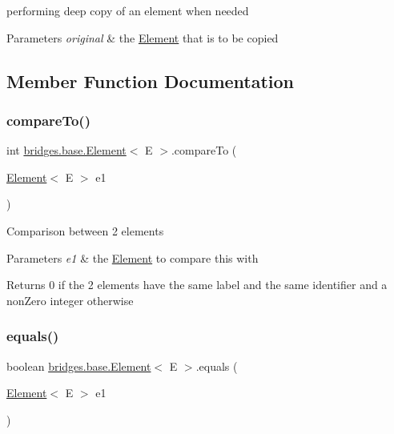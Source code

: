 performing deep copy of an element when needed


\begin{DoxyParams}{Parameters}
{\em original} & the \mbox{\hyperlink{classbridges_1_1base_1_1_element}{Element}} that is to be copied \\
\hline
\end{DoxyParams}


\subsection{Member Function Documentation}
\mbox{\label{classbridges_1_1base_1_1_element_a6cd4c4f15c6a4f87f59e443cffe87a20}} 
\subsubsection{\texorpdfstring{compareTo()}{compareTo()}}
{\footnotesize\ttfamily int \mbox{\hyperlink{classbridges_1_1base_1_1_element}{bridges.\+base.\+Element}}$<$ E $>$.compare\+To (\begin{DoxyParamCaption}\item[{\mbox{\hyperlink{classbridges_1_1base_1_1_element}{Element}}$<$ E $>$}]{e1 }\end{DoxyParamCaption})}

Comparison between 2 elements 
\begin{DoxyParams}{Parameters}
{\em e1} & the \mbox{\hyperlink{classbridges_1_1base_1_1_element}{Element}} to compare this with \\
\hline
\end{DoxyParams}
\begin{DoxyReturn}{Returns}
0 if the 2 elements have the same label and the same identifier and a non\+Zero integer otherwise 
\end{DoxyReturn}
\mbox{\label{classbridges_1_1base_1_1_element_aff10d60700eb1aceca5c0b519bdccccb}} 
\subsubsection{\texorpdfstring{equals()}{equals()}}
{\footnotesize\ttfamily boolean \mbox{\hyperlink{classbridges_1_1base_1_1_element}{bridges.\+base.\+Element}}$<$ E $>$.equals (\begin{DoxyParamCaption}\item[{\mbox{\hyperlink{classbridges_1_1base_1_1_element}{Element}}$<$ E $>$}]{e1 }\end{DoxyParamCaption})}

